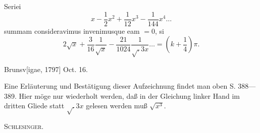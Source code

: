 \indent Seriei
\[
x-\frac12x^2+\frac1{12}x^3-\frac1{144}x^4\ldots
\]
\noindent summam consideravimus invenimusque eam \(=0\), si
\[
2\surd x+\frac3{16}\frac1{\surd x}-\frac{21}{1024}\frac1{\surd{.}3x}\ldots=\left(k+\frac14\right)\pi.
\]
\par\noindent\hfill Brunsv[igae, 1797] Oct. 16.

\medskip\begingroup\small
\indent Eine Erläuterung und Bestätigung dieser Aufzeichnung findet man oben S. 388—389. Hier möge nur wiederholt werden, daß in der Gleichung linker Hand im dritten Gliede statt \(\surd{.}3x\) gelesen werden muß \(\sqrt{x^3}\).
\par\noindent\hfill\textsc{Schlesinger.}
\par\endgroup

